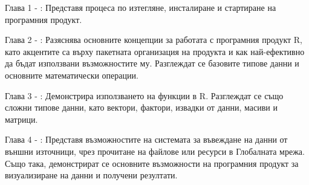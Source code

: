 Глава 1 - : Представя процеса по изтегляне, инсталиране и стартиране на програмния продукт.

Глава 2 - : Разяснява основните концепции за работата с програмния продукт R, като акцентите са върху пакетната организация на продукта и как най-ефективно да бъдат използвани възможностите му. Разглеждат се базовите типове данни и основните математически операции. 

Глава 3 - : Демонстрира използването на функции в R. Разглеждат се също сложни типове данни, като вектори, фактори, извадки от данни, масиви и матрици. 

Глава 4 - : Представя възможностите на системата за въвеждане на данни от външни източници, чрез прочитане на файлове или ресурси в Глобалната мрежа. Също така, демонстрират се основните възможности на програмния продукт за визуализиране на данни и получени резултати.  


